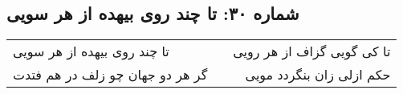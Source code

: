 \begin{center}
\section*{شماره ۳۰: تا چند روی بیهده از هر سویی}
\label{sec:030}
\begin{longtable}{l p{0.5cm} r}
تا چند روی بیهده از هر سویی
&&
تا کی گویی گزاف از هر رویی
\\
گر هر دو جهان چو زلف در هم فتدت
&&
حکم ازلی زان بنگردد مویی
\\
\end{longtable}
\end{center}
